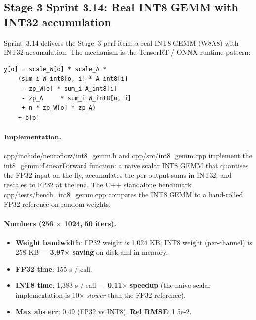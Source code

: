\documentclass[10pt,twocolumn]{article}
\renewcommand{\texttt}[1]{{\normalfont\ttfamily #1}\normalfont\rmfamily}
\begin{document}
\subsection{Stage 3 Sprint 3.14: Real INT8 GEMM with INT32 accumulation}
\label{sec:int8-gemm}

Sprint~3.14 delivers the Stage~3 perf item: a real
INT8 GEMM (W8A8) with INT32 accumulation.  The
mechanism is the TensorRT / ONNX runtime pattern:

\begin{verbatim}
y[o] = scale_W[o] * scale_A *
    (sum_i W_int8[o, i] * A_int8[i]
     - zp_W[o] * sum_i A_int8[i]
     - zp_A     * sum_i W_int8[o, i]
     + n * zp_W[o] * zp_A)
    + b[o]
\end{verbatim}

\paragraph{Implementation.}
\texttt{cpp/include/neuroflow/int8\_gemm.h} and
\texttt{cpp/src/int8\_gemm.cpp} implement the
\texttt{int8\_gemm::LinearForward} function: a
naive scalar INT8 GEMM that quantises the FP32
input on the fly, accumulates the per-output sums
in INT32, and rescales to FP32 at the end.  The
C{++} standalone benchmark
\texttt{cpp/tests/bench\_int8\_gemm.cpp} compares
the INT8 GEMM to a hand-rolled FP32 reference on
random weights.

\paragraph{Numbers (256 $\times$ 1024, 50 iters).}
\begin{itemize}
\item \textbf{Weight bandwidth}: FP32 weight is
1{,}024 KB; INT8 weight (per-channel) is 258 KB ---
\textbf{3.97$\times$ saving} on disk and in memory.
\item \textbf{FP32 time}: 155 \textmu s / call.
\item \textbf{INT8 time}: 1{,}383 \textmu s / call ---
\textbf{0.11$\times$ speedup} (the naive scalar
implementation is 10$\times$ \emph{slower} than the
FP32 reference).
\item \textbf{Max abs err}: 0.49 (FP32 vs INT8).
\textbf{Rel RMSE}: 1.5e-2.
\end{itemize}
\end{document}

